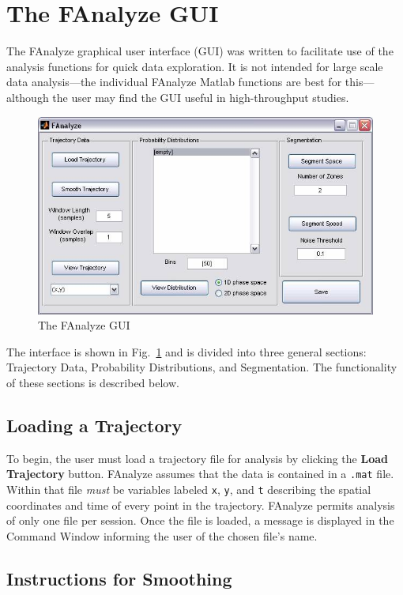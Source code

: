 \documentclass[letterpaper, 11pt]{article}
\begin{document}
\section{The FAnalyze GUI}
The FAnalyze graphical user interface (GUI) was written to facilitate use of the analysis functions
for quick data exploration.  It is not intended for large scale data analysis---the individual
FAnalyze Matlab functions are best for this---although the user may find the GUI useful in
high-throughput studies.
\begin{figure}
    \centering
    \hspace{-0cm}
    \includegraphics[bb= 0.0 0.0 622.0 367.0 clip=true, scale = 0.7]{GUI.jpg}
    \caption{The FAnalyze GUI}
    \label{GUI}
\end{figure}
The interface is shown in Fig.\ \ref{GUI} and is divided into three general sections: Trajectory
Data, Probability Distributions, and Segmentation. The functionality of these sections is described
below.


\subsection*{Loading a Trajectory}

To begin, the user must load a trajectory file for analysis by clicking the \textbf{Load
Trajectory} button. FAnalyze assumes that the data is contained in a \texttt{.mat} file.  Within
that file \emph{must} be variables labeled \texttt{x}, \texttt{y}, and \texttt{t} describing the
spatial coordinates and time of every point in the trajectory. FAnalyze permits analysis of only
one file per session.  Once the file is loaded, a message is displayed in the Command Window
informing the user of the chosen file's name.

\subsection*{Instructions for Smoothing}
\end{document}
